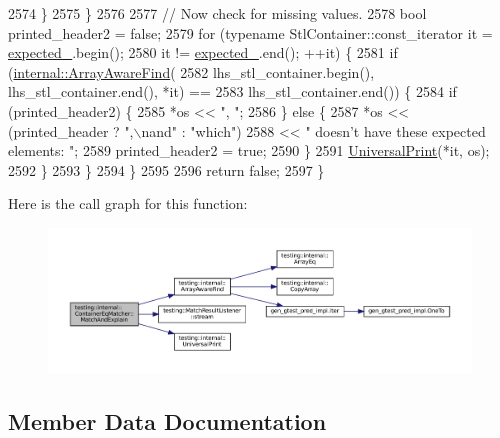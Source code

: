\begin{DoxyCode}
2574         \}
2575       \}
2576 
2577       \textcolor{comment}{// Now check for missing values.}
2578       \textcolor{keywordtype}{bool} printed\_header2 = \textcolor{keyword}{false};
2579       \textcolor{keywordflow}{for} (\textcolor{keyword}{typename} StlContainer::const\_iterator it = \hyperlink{classtesting_1_1internal_1_1ContainerEqMatcher_ab5d9ad6869dc59908a4b1c72fde78d31}{expected\_}.begin();
2580            it != \hyperlink{classtesting_1_1internal_1_1ContainerEqMatcher_ab5d9ad6869dc59908a4b1c72fde78d31}{expected\_}.end(); ++it) \{
2581         \textcolor{keywordflow}{if} (\hyperlink{namespacetesting_1_1internal_a94a857fe6ff32cf4fdc4769a4071f239}{internal::ArrayAwareFind}(
2582                 lhs\_stl\_container.begin(), lhs\_stl\_container.end(), *it) ==
2583             lhs\_stl\_container.end()) \{
2584           \textcolor{keywordflow}{if} (printed\_header2) \{
2585             *os << \textcolor{stringliteral}{", "};
2586           \} \textcolor{keywordflow}{else} \{
2587             *os << (printed\_header ? \textcolor{stringliteral}{",\(\backslash\)nand"} : \textcolor{stringliteral}{"which"})
2588                 << \textcolor{stringliteral}{" doesn't have these expected elements: "};
2589             printed\_header2 = \textcolor{keyword}{true};
2590           \}
2591           \hyperlink{namespacetesting_1_1internal_a30708fa2bacf11895b03bdb21eb72309}{UniversalPrint}(*it, os);
2592         \}
2593       \}
2594     \}
2595 
2596     \textcolor{keywordflow}{return} \textcolor{keyword}{false};
2597   \}
\end{DoxyCode}
Here is the call graph for this function\+:
\nopagebreak
\begin{figure}[H]
\begin{center}
\leavevmode
\includegraphics[width=350pt]{classtesting_1_1internal_1_1ContainerEqMatcher_a348c6139776dd7d713d100e406ee38f4_cgraph}
\end{center}
\end{figure}


\subsection{Member Data Documentation}
\mbox{\label{classtesting_1_1internal_1_1ContainerEqMatcher_ab5d9ad6869dc59908a4b1c72fde78d31}} 
